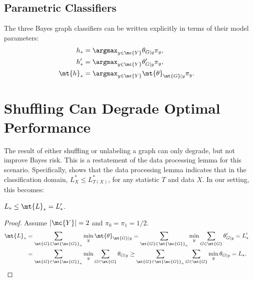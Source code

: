 \documentclass[10pt,journal,cspaper,compsoc]{IEEEtran}
\begin{document}
\subsection{Parametric Classifiers} %
\label{sub:parametric_classifiers}


The three Bayes graph classifiers can be written explicitly in terms of their model parameters:
\begin{align}
	h_* &= \argmax_{y \in \mc{Y}} \theta_{G|y}\pi_y, \\
	h_*' &= \argmax_{y \in \mc{Y}} \theta_{G|y}' \pi_y, \\
	\mt{h}_* &= \argmax_{y \in \mc{Y}}  \mt{\theta}_{\mt{G}|y}\pi_y. \label{eq:unbayes2}
\end{align}




\section{Shuffling Can Degrade Optimal Performance} %
\label{sec:shuffle}





The result of either shuffling or unlabeling a graph can only degrade, but not improve Bayes risk.  This is a restatement of the data processing lemma for this scenario. Specifically, \cite{DEV96} shows that the data processing lemma indicates that in the classification domain, $L^*_X \leq L^*_{T(X)}$, for any statistic $T$ and data $X$.  In our setting, this becomes:

\begin{thm} \label{thm:1}
$L_* \leq \mt{L}_*=L_*'$.
\end{thm}

\begin{proof}
	Assume $|\mc{Y}|=2$ and $\pi_0=\pi_1=1/2$.  
\begin{align} \label{eq:thm1}
	\mt{L}_*&=\sum_{\mt{G} \in \mt{\mc{G}}_n} \min_y  \mt{\theta}_{\mt{G}|y}  
	=\sum_{\mt{G} \in \mt{\mc{G}}_n} \min_y  \sum_{G \in \mt{G}}\theta_{G|y}'  = L_*' \nonumber \\
	&=\sum_{\mt{G} \in \mt{\mc{G}}_n} \min_y  \sum_{G \in \mt{G}}\theta_{G|y} 
	 \geq \sum_{\mt{G} \in \mt{\mc{G}}_n} \sum_{G \in \mt{G}} \min_y  \theta_{G|y}  = L_*.
\end{align}
\end{proof}
\end{document}
